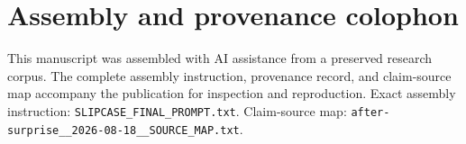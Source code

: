 \documentclass[11pt]{article}
\begin{document}
\clearpage
\section*{Assembly and provenance colophon}
This manuscript was assembled with AI assistance from a preserved research corpus. The complete assembly instruction, provenance record, and claim-source map accompany the publication for inspection and reproduction. Exact assembly instruction: \texttt{SLIPCASE\_FINAL\_PROMPT.txt}. Claim-source map: \texttt{after-surprise\_\_2026-08-18\_\_SOURCE\_MAP.txt}.
\end{document}
